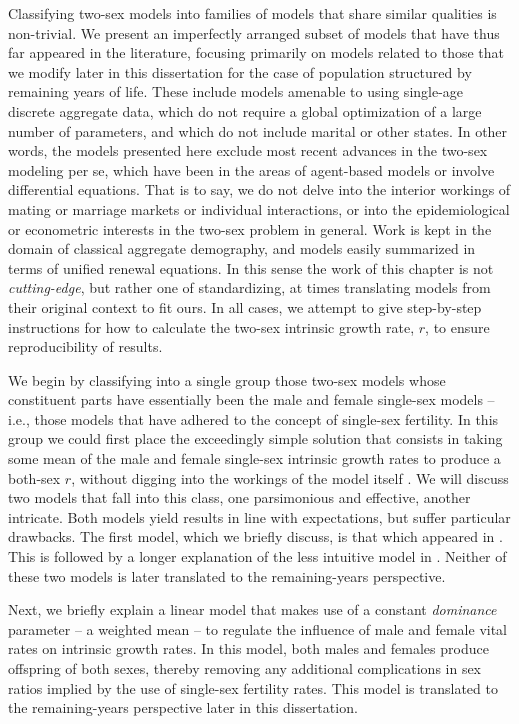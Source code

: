 Classifying two-sex models into families of models that share similar qualities
is non-trivial. We present an imperfectly arranged subset of models that
have thus far appeared in the literature, focusing primarily on models
related to those that we modify later in this dissertation for the case of
population structured by remaining years of life. These include models amenable
to using single-age discrete aggregate data, which do not require a global
optimization of a large number of parameters, and which do not include marital
or other states. In other words, the models presented here exclude most recent
advances in the two-sex modeling per se, which have been in the areas of
agent-based models or involve differential equations. That is to say, we do not
delve into the interior workings of mating or marriage markets or individual interactions, or into the epidemiological or econometric interests in the two-sex problem in general. Work
is kept in the domain of classical aggregate demography, and models easily
summarized in terms of unified renewal equations. In this sense the work of
this chapter is not \textit{cutting-edge}, but rather one of standardizing, at
times translating models from their original context to fit ours. In all cases,
we attempt to give step-by-step instructions for how to calculate the
two-sex intrinsic growth rate, $r$, to ensure reproducibility of results.

We begin by classifying into a single group those two-sex models whose
constituent parts have essentially been the male and female single-sex models --
i.e., those models that have adhered to the concept of single-sex fertility. In
this group we could first place the exceedingly simple solution that consists in taking some 
mean of the male and female single-sex intrinsic growth rates to produce a 
both-sex $r$, without digging into the workings of the model
itself \citep[e.g., ][]{kuczynski1932fertility}. We will discuss two models that
fall into this class, one parsimonious and effective, another intricate. Both
models yield results in line with expectations, but suffer
particular drawbacks. The first model, which we briefly discuss, is that
which appeared in \citet{pollard1948measurement}. This is followed by
a longer explanation of the less intuitive model in \citet{mitra1978derivation}.
Neither of these two models is later translated to the remaining-years
perspective.

Next, we briefly explain a linear model that makes use of a constant
\textit{dominance} parameter -- a weighted mean -- to regulate the
influence of male and female vital rates on intrinsic growth rates. In this
model, both males and females produce offspring of both sexes, thereby
removing any additional complications in sex ratios implied by the use of
single-sex fertility rates. This model is translated to the
remaining-years perspective later in this dissertation.

